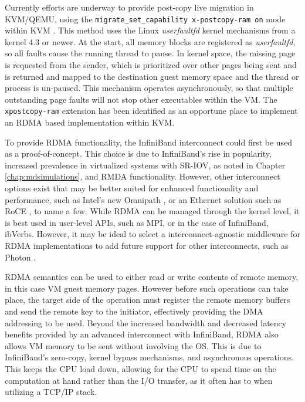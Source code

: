 Currently efforts are underway to provide post-copy live migration in KVM/QEMU, using the \verb!migrate_set_capability x-postcopy-ram on! mode within KVM \cite{www-kvm-postcopy}. This method uses the Linux \emph{userfaultfd} kernel mechanisms from a kernel 4.3 or newer. At the start, all memory blocks are registered as \emph{userfaultfd}, so all faults cause the running thread to pause. In kernel space, the missing page is requested from the sender, which is prioritized over other pages being sent and is returned and mapped to the destination guest memory space and the thread or process is un-paused. This mechanism operates asynchronously, so that multiple outstanding page faults will not stop other executables within the VM. The \verb!xpostcopy-ram! extension has been identified as an opportune place to implement an RDMA based implementation within KVM. 

To provide RDMA functionality, the InfiniBand interconnect could first be used as a proof-of-concept. This choice is due to InfiniBand's rise in popularity, increased prevalence in virtualized systems with SR-IOV, as noted in Chapter \ref{chap:mdsimulations}, and RMDA functionality. However, other interconnect options exist that may be better suited for enhanced functionality and performance, such as Intel's new Omnipath \cite{omnipath2015}, or an Ethernet solution such as RoCE \cite{beck2011roce}, to name a few.  While RDMA can be managed through the kernel level, it is best used in user-level APIs, such as MPI, or in the case of InfiniBand, ibVerbs. However, it may be ideal to select a interconnect-agnostic middleware for RDMA implementations to add future support for other interconnects, such as Photon \cite{kissel2016photon}.



RDMA semantics can be used to either read or write contents of remote memory, in this case VM guest memory pages. However before such operations can take place, the target side of the operation must register the remote memory buffers and send the remote key to the initiator, effectively providing the DMA addressing to be used. Beyond the increased bandwidth and decreased latency benefits provided by an advanced interconnect with InfiniBand, RDMA also allows VM memory to be sent without involving the OS. This is due to InfiniBand's zero-copy, kernel bypass mechanisms, and asynchronous operations. This keeps the CPU load down, allowing for the CPU to spend time on the computation at hand rather than the I/O transfer, as it often has to when utilizing a TCP/IP stack. 
 

